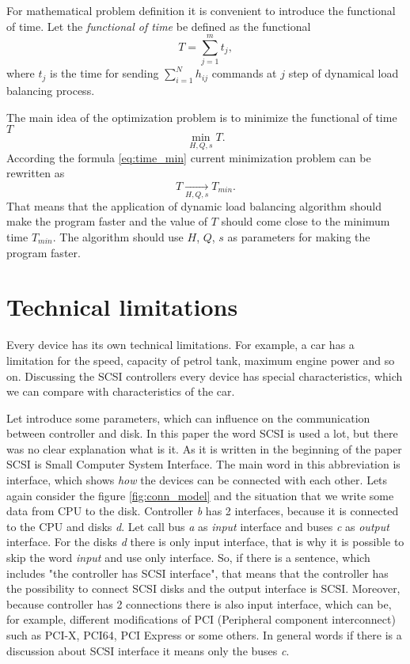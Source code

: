For mathematical problem definition it is convenient to introduce the functional of time. Let the \emph{functional of time} be defined as the functional 
\begin{equation}
	T=\sum_{j=1}^{m}t_j,
\end{equation}
where $t_j$ is the time for sending $\sum_{i=1}^{N}h_{ij}$ commands at $j$ step of dynamical load balancing process.

The main idea of the optimization problem is to minimize the functional of time $T$
\begin{equation}
	\min_{H,Q,s}T.
\end{equation}
According the formula \ref{eq:time_min} current minimization problem can be rewritten as
\begin{equation}
	T \xrightarrow[H,Q,s]{} T_{min}.
\end{equation}
That means that the application of dynamic load balancing algorithm should make the program faster and the value of $T$ should come close to the minimum time $T_{min}$. The algorithm should use $H$, $Q$, $s$ as parameters for making the program faster.


\section{Technical limitations}
Every device has its own technical limitations. For example, a car has a limitation for the speed, capacity of petrol tank, maximum engine power and so on. Discussing the SCSI controllers every device has special characteristics, which we can compare with characteristics of the car.

Let introduce some parameters, which can influence on the communication between controller and disk. 
In this paper the word SCSI is used a lot, but there was no clear explanation what is it. As it is written in the beginning of the paper SCSI is Small Computer System Interface. The main word in this abbreviation is interface, which shows \emph{how} the devices can be connected with each other. Lets again consider the figure \ref{fig:conn_model} and the situation that we write some data from CPU to the disk. Controller \emph{b} has 2 interfaces, because it is connected to the CPU and disks \emph{d}. Let call bus \emph{a} as \emph{input} interface and buses \emph{c} as \emph{output} interface. For the disks \emph{d} there is only input interface, that is why it is possible to skip the word \emph{input} and use only interface. So, if there is a sentence, which includes "the controller has SCSI interface", that means that the controller has the possibility to connect SCSI disks and the output interface is SCSI. Moreover, because controller has 2 connections there is also input interface, which can be, for example, different modifications of PCI (Peripheral component interconnect) such as PCI-X, PCI64, PCI Express or some others. In general words if there is a discussion about SCSI interface it means only the buses \emph{c}.

